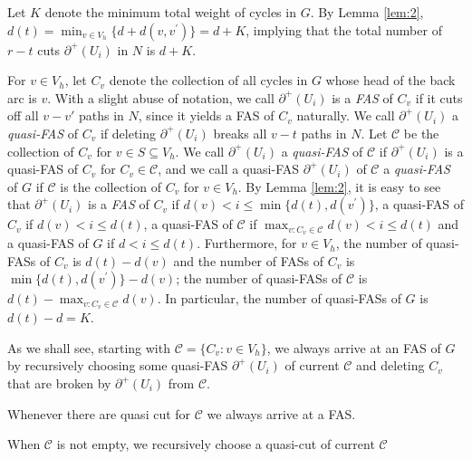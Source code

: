 \documentclass[11pt]{article}
\begin{document}
Let $K$ denote the minimum total weight of cycles in $G$. By Lemma \ref{lem:2}, $d(t)=\min_{v\in V_h}\{d+d(v,v^\prime)\}=d+K$, implying that the total number of $r-t$ cuts $\partial^+(U_i)$ in $N$ is $d+K$.

For $v\in V_h$, let $C_v$ denote the collection of all cycles in $G$ whose head of the back arc is $v$. With a slight abuse of notation, we call $\partial^+(U_i)$ is a \emph{FAS} of $C_v$ if it cuts off all $v-v'$ paths in $N$, since it yields a FAS of $C_v$ naturally. We call $\partial^+(U_i)$ a \emph{quasi-FAS} of $C_v$ if deleting $\partial^+(U_i)$ breaks all $v-t$ paths in $N$. Let $\mathcal{C}$ be the collection of $C_v$ for $v\in S\subseteq V_h$. We call $\partial^+(U_i)$ a \emph{quasi-FAS} of $\mathcal{C}$ if $\partial^+(U_i)$ is a quasi-FAS of $C_v$ for $C_v\in\mathcal{C}$, and we call a quasi-FAS $\partial^+(U_i)$ of $\mathcal{C}$ a \emph{quasi-FAS} of $G$ if $\mathcal{C}$ is the collection of $C_v$ for $v\in V_h$. By Lemma \ref{lem:2}, it is easy to see that $\partial^+(U_i)$ is a \emph{FAS} of $C_v$ if $d(v)<i\leq \min\{d(t),d(v^\prime)\}$, a quasi-FAS of $C_v$ if $d(v) <i\leq d(t)$, a quasi-FAS of $\mathcal{C}$ if $\max_{v:C_v\in \mathcal{C}}d(v)<i\leq d(t)$ and a quasi-FAS of $G$ if $d<i\leq d(t)$. Furthermore, for $v\in V_h$, the number of quasi-FASs of $C_v$ is $d(t)-d(v)$ and the number of FASs of $C_v$ is $\min\{d(t),d(v^\prime)\}-d(v)$; the number of quasi-FASs of $\mathcal{C}$ is $d(t)-\max_{v:C_v\in \mathcal{C}}d(v)$. In particular, the number of quasi-FASs of $G$ is $d(t)-d=K$.

 As we shall see, starting with $\mathcal{C}=\{C_v: v\in V_h\}$, we always arrive at an FAS of $G$ by recursively choosing some quasi-FAS $\partial^+(U_i)$ of current $\mathcal{C}$ and deleting $C_v$ that are broken by $\partial^+(U_i)$ from $\mathcal{C}$.

Whenever there are quasi cut for $\mathcal{C}$ we always arrive at a FAS.

When $\mathcal{C}$ is not empty, we recursively choose a quasi-cut of current $\mathcal{C}$
\end{document}

